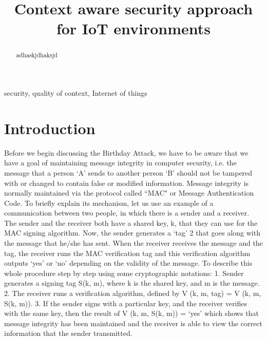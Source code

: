 \documentclass[letterpaper,conference]{IEEEtran}
\begin{document}
\title{Context aware security approach for IoT environments}
\author{
}

\maketitle

\begin{abstract}
adhaskjdhaksjd \cite{tanenbaum2002distributed}
\end{abstract}

\begin{IEEEkeywords}
security, quality of context, Internet of things
\end{IEEEkeywords}

\IEEEpeerreviewmaketitle

\section{Introduction}

Before we begin discussing the Birthday Attack, we have to be aware that we have a goal of maintaining
message integrity in computer security, i.e. the message that a person ‘A’ sends to another person ‘B’
should not be tampered with or changed to contain false or modified information. Message integrity is
normally maintained via the protocol called “MAC" or Message Authentication Code. To briefly explain
its mechanism, let us use an example of a communication between two people, in which there is a sender
and a receiver. The sender and the receiver both have a shared key, k, that they can use for the MAC
signing algorithm. Now, the sender generates a ‘tag’ 2 that goes along with the message that he/she has
sent. When the receiver receives the message and the tag, the receiver runs the MAC verification tag and
this verification algorithm outputs ‘yes’ or ‘no’ depending on the validity of the message. To describe this
whole procedure step by step using some cryptographic notations:
1. Sender generates a signing tag S(k, m), where k is the shared key, and m is the message.
2. The receiver runs a verification algorithm, defined by V (k, m, tag) = V (k, m, S(k, m)).
3. If the sender signs with a particular key, and the receiver verifies with the same key, then the
result of V (k, m, S(k, m)) = ‘yes’ which shows that message integrity has been maintained and the
receiver is able to view the correct information that the sender transmitted.
\end{document}
